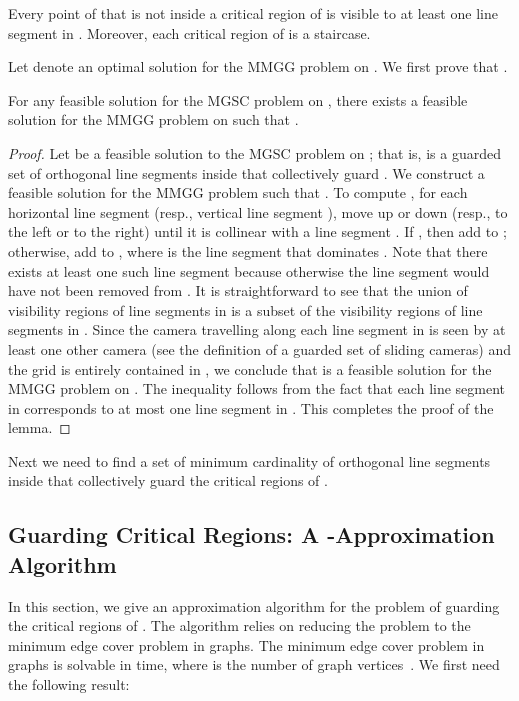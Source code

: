 \documentclass{llncs}
\begin{document}
\begin{lemma}
\label{lem:contradiction}
Every point of  that is not inside a critical region of  is visible to at least one
line segment in . Moreover, each critical region of  is a staircase.
\end{lemma}

Let  denote an optimal solution for the MMGG problem on . We first prove
that .

\begin{lemma}
\label{lem:polygonAndGP}For any feasible solution  for the MGSC problem on , there exists a feasible solution  for the MMGG problem on  such that .
\end{lemma}
\begin{proof}
Let  be a feasible solution to the MGSC problem on ; that is,  is a guarded set of orthogonal line segments
inside  that collectively guard . We construct a feasible solution  for the MMGG problem such that
. To compute , for each horizontal line segment  (resp., vertical
line segment ), move  up or down (resp., to the left or to the right) until it is collinear with a line segment
. If , then add  to ; otherwise, add  to , where  is the line segment that dominates . Note that there exists at least one such line segment  because otherwise the line segment  would have not been removed from . It is straightforward to see that the union of visibility regions of line segments in  is a subset of the visibility regions of line segments in . Since the camera travelling along each line segment in  is seen by at least one other camera (see the definition of a guarded set of sliding cameras) and the grid 
is entirely contained in , we conclude that  is a feasible solution for the MMGG problem on . The inequality
 follows from the fact that each line segment in  corresponds to at most one line
segment in . This completes the proof of the lemma.
\end{proof}

Next we need to find a set of minimum cardinality of orthogonal line
segments inside  that collectively guard the critical regions of .





\subsection{Guarding Critical Regions: A \boldmath-Approximation Algorithm}
\label{subsec:exactAlgorithmForCriticals}
In this section, we give an approximation algorithm for the problem of guarding the critical regions of
. The algorithm relies on reducing the problem to the minimum edge cover problem in graphs. The
minimum edge cover problem in graphs is solvable in  time, where  is
the number of graph vertices~\cite{vazirani1980}. We first need the following result:
\end{document}
